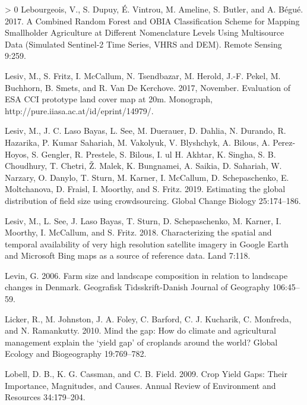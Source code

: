 \documentclass[11pt,a4paper]{article}
\newlength{\cslhangindent}
\newenvironment{CSLReferences}[3] %
 {%
  \setlength{\parindent}{0pt}
  \ifodd #1 \everypar{\setlength{\hangindent}{\cslhangindent}}\ignorespaces\fi
  \ifnum #2 > 0
  \setlength{\parskip}{#2\baselineskip}
  \fi
 }%
 {}
\begin{document}
\begin{CSLReferences}{1}{0}
\leavevmode\hypertarget{ref-lebourgeoisCombinedRandomForest2017}{}%
Lebourgeois, V., S. Dupuy, É. Vintrou, M. Ameline, S. Butler, and A.
Bégué. 2017. A {Combined Random Forest} and {OBIA Classification Scheme}
for {Mapping Smallholder Agriculture} at {Different Nomenclature Levels
Using Multisource Data} ({Simulated Sentinel}-2 {Time Series}, {VHRS}
and {DEM}). Remote Sensing 9:259.

\leavevmode\hypertarget{ref-LesivEvaluationESACCI2017}{}%
Lesiv, M., S. Fritz, I. McCallum, N. Tsendbazar, M. Herold, J.-F. Pekel,
M. Buchhorn, B. Smets, and R. Van De Kerchove. 2017, November.
Evaluation of {ESA CCI} prototype land cover map at 20m. Monograph,
http://pure.iiasa.ac.at/id/eprint/14979/.

\leavevmode\hypertarget{ref-lesivEstimatingGlobalDistribution2019}{}%
Lesiv, M., J. C. Laso Bayas, L. See, M. Duerauer, D. Dahlia, N. Durando,
R. Hazarika, P. Kumar Sahariah, M. Vakolyuk, V. Blyshchyk, A. Bilous, A.
Perez-Hoyos, S. Gengler, R. Prestele, S. Bilous, I. ul H. Akhtar, K.
Singha, S. B. Choudhury, T. Chetri, Ž. Malek, K. Bungnamei, A. Saikia,
D. Sahariah, W. Narzary, O. Danylo, T. Sturn, M. Karner, I. McCallum, D.
Schepaschenko, E. Moltchanova, D. Fraisl, I. Moorthy, and S. Fritz.
2019. Estimating the global distribution of field size using
crowdsourcing. Global Change Biology 25:174--186.

\leavevmode\hypertarget{ref-LesivCharacterizingspatialtemporal2018}{}%
Lesiv, M., L. See, J. Laso Bayas, T. Sturn, D. Schepaschenko, M. Karner,
I. Moorthy, I. McCallum, and S. Fritz. 2018. Characterizing the spatial
and temporal availability of very high resolution satellite imagery in
{Google Earth} and {Microsoft Bing} maps as a source of reference data.
Land 7:118.

\leavevmode\hypertarget{ref-levinFarmSizeLandscape2006}{}%
Levin, G. 2006. Farm size and landscape composition in relation to
landscape changes in {Denmark}. Geografisk Tidsskrift-Danish Journal of
Geography 106:45--59.

\leavevmode\hypertarget{ref-LickerMindgaphow2010}{}%
Licker, R., M. Johnston, J. A. Foley, C. Barford, C. J. Kucharik, C.
Monfreda, and N. Ramankutty. 2010. Mind the gap: How do climate and
agricultural management explain the {`yield gap'} of croplands around
the world? Global Ecology and Biogeography 19:769--782.

\leavevmode\hypertarget{ref-lobellCropYieldGaps2009}{}%
Lobell, D. B., K. G. Cassman, and C. B. Field. 2009. Crop {Yield Gaps}:
{Their Importance}, {Magnitudes}, and {Causes}. Annual Review of
Environment and Resources 34:179--204.


\end{CSLReferences}
\end{document}
